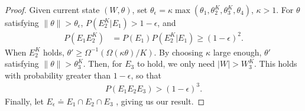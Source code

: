 \begin{proof}
Given current state $(W, \theta)$, set $\theta_\epsilon =
\kappa \max(\theta_1,\theta^K_2,\theta^K_3, \theta_4)$, $\kappa > 1$.
For $\theta$ satisfying $ \parallel \theta \parallel > \theta_\epsilon$, $P(E^K_2 | E_1)>1-\epsilon$, and
\begin{align*}
P(E_1E^K_2) %
& = P(E_1) P(E^K_2|E_1) \ge (1 - \epsilon)^2.
\end{align*}
When $E^K_2$ holds, $\theta' \ge \Omega^{-1}(\Omega(\kappa\theta)/K)$.
By choosing $\kappa$ large enough, $\theta'$ satisfying $ \parallel \theta \parallel > \theta^K_3$. Then, for
$E_3$ to hold, we only need $|W| > W^K_3$. This holds with probability
greater than $1-\epsilon$, so that
\begin{align*}
  P(E_1E_2E_3) > (1- \epsilon)^3.
\end{align*}
Finally, let $E_\epsilon \doteq E_1\cap E_2 \cap E_3$ , giving us our result.


\end{proof}

